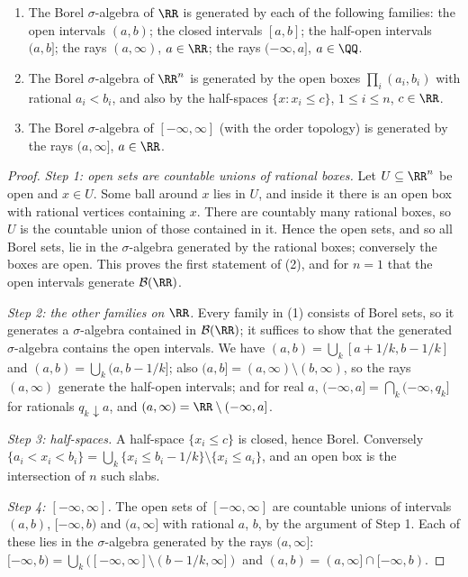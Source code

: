 \begin{proposition}\label{measure-theory:proposition-borel-generators}
\begin{enumerate}
\item The Borel $\sigma$-algebra of $\RR$ is generated by each of the following families: the open intervals $(a, b)$; the closed intervals $[a, b]$; the half-open intervals $(a, b]$; the rays
$(a, \infty)$, $a \in \RR$; the rays $(-\infty, a]$, $a \in \QQ$.
\item The Borel $\sigma$-algebra of $\RR^n$ is generated by the open boxes $\prod_i(a_i, b_i)$ with rational $a_i < b_i$, and also by the half-spaces $\{x : x_i \leq c\}$, $1 \leq i \leq n$, $c \in \RR$.
\item The Borel $\sigma$-algebra of $[-\infty, \infty]$ (with the order topology) is generated by the rays $(a, \infty]$, $a \in \RR$.
\end{enumerate}
\end{proposition}

\begin{proof}
\emph{Step 1: open sets are countable unions of rational boxes.} Let $U \subseteq \RR^n$ be open and $x \in U$. Some ball around $x$ lies in $U$, and inside it there is an open box with rational vertices
containing $x$. There are countably many rational boxes, so $U$ is the countable union of those contained in it. Hence the open sets, and so all Borel sets, lie in the $\sigma$-algebra generated by the
rational boxes; conversely the boxes are open. This proves the first statement of (2), and for $n = 1$ that the open intervals generate $\mathcal{B}(\RR)$.

\emph{Step 2: the other families on $\RR$.} Every family in (1) consists of Borel sets, so it generates a $\sigma$-algebra contained in $\mathcal{B}(\RR)$; it suffices to show that the generated
$\sigma$-algebra contains the open intervals. We have $(a, b) = \bigcup_k[a + 1/k, b - 1/k]$ and $(a, b) = \bigcup_k(a, b - 1/k]$; also $(a, b] = (a, \infty) \setminus (b, \infty)$, so the rays
$(a, \infty)$ generate the half-open intervals; and for real $a$, $(-\infty, a] = \bigcap_k(-\infty, q_k]$ for rationals $q_k \downarrow a$, and $(a, \infty) = \RR \setminus (-\infty, a]$.

\emph{Step 3: half-spaces.} A half-space $\{x_i \leq c\}$ is closed, hence Borel. Conversely $\{a_i < x_i < b_i\} = \bigcup_k\{x_i \leq b_i - 1/k\} \setminus \{x_i \leq a_i\}$, and an open box is the
intersection of $n$ such slabs.

\emph{Step 4: $[-\infty, \infty]$.} The open sets of $[-\infty, \infty]$ are countable unions of intervals $(a, b)$, $[-\infty, b)$ and $(a, \infty]$ with rational $a$, $b$, by the argument of Step 1.
Each of these lies in the $\sigma$-algebra generated by the rays $(a, \infty]$: $[-\infty, b) = \bigcup_k([-\infty, \infty] \setminus (b - 1/k, \infty])$ and $(a, b) = (a, \infty] \cap [-\infty, b)$.
\end{proof}

